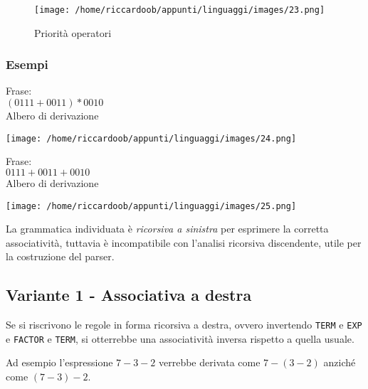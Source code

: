 \begin{figure}[H]
    \caption{Priorità operatori}
    \centering
    \texttt{[image: /home/riccardoob/appunti/linguaggi/images/23.png]}
\end{figure}

\subsubsection{Esempi}

\begin{multicols}{2}
    Frase:\\
    \noindent
    $(0111 + 0011) * 0010$\\
    Albero di derivazione
    \begin{multicolfigure}
        \centering
        \texttt{[image: /home/riccardoob/appunti/linguaggi/images/24.png]}
    \end{multicolfigure}
    \columnbreak
    Frase:\\
    \noindent
    $0111 + 0011 + 0010$\\
    Albero di derivazione
    \begin{multicolfigure}
        \centering
        \texttt{[image: /home/riccardoob/appunti/linguaggi/images/25.png]}
    \end{multicolfigure}
\end{multicols}

La grammatica individuata è \textit{ricorsiva a sinistra} per esprimere la corretta associatività, tuttavia è incompatibile con l'analisi ricorsiva discendente, utile per la costruzione del parser.

\subsection{Variante 1 - Associativa a destra}
Se si riscrivono le regole in forma ricorsiva a destra, ovvero invertendo \texttt{TERM} e \texttt{EXP} e \texttt{FACTOR} e \texttt{TERM}, si otterrebbe una associatività inversa rispetto a quella usuale.

Ad esempio l'espressione $7 - 3 - 2$ verrebbe derivata come $7 - ( 3 - 2 )$ anziché come $( 7 - 3 ) - 2$.


